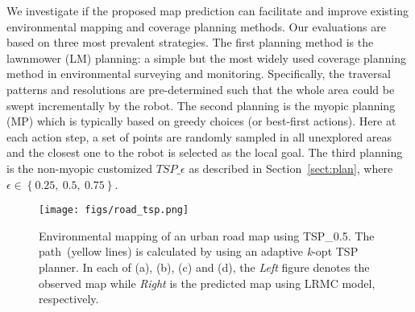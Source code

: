 We investigate if the proposed map prediction can facilitate and improve existing environmental mapping and coverage planning methods. 
Our evaluations are based on three most prevalent strategies. 
The first planning method is the lawnmower (LM) planning: a simple but the most widely used coverage planning method in environmental surveying and monitoring.  Specifically, the traversal patterns and resolutions are pre-determined such that the whole area could be swept incrementally by the robot.
The second planning is the myopic planning (MP) which is typically based on greedy choices (or best-first actions). Here at each action step, a set of points are randomly sampled in all unexplored areas and the closest one to the robot is selected as the local goal. 
The third planning is the non-myopic customized $TSP\_\epsilon$ as described in Section~\ref{sect:plan}, 
where $\epsilon \in \left \{ 0.25,~0.5,~0.75 \right \}$. %





\begin{figure*} %
  \centering
  	{\label{fig:road_tsp}\texttt{[image: figs/road\_tsp.png]}}
  \caption{\small Environmental mapping of an urban road map using TSP\_{0.5}. The path~(yellow lines) is calculated by using an adaptive \textit{k}-opt TSP planner. %
  In each of (a), (b), (c) and (d),  the \textit{Left} figure denotes the observed map while \textit{Right} is the predicted map using LRMC model, respectively. 
  } \vspace{-10pt}
\label{fig:road_tsp}  
\end{figure*}

